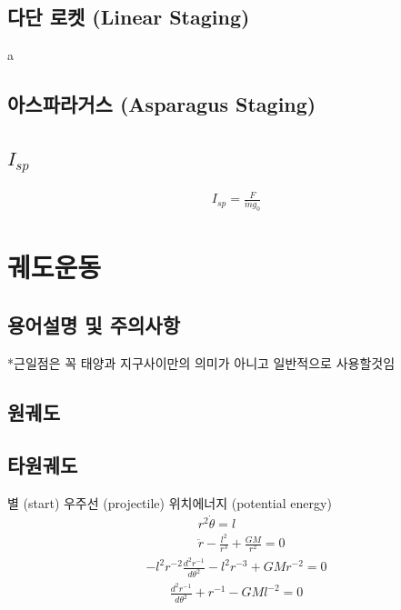 \documentclass[9pt]{amsbook}
\begin{document}
\section{다단 로켓 (Linear Staging)}
a


\section{아스파라거스 (Asparagus Staging)}

\section{$I_{sp}$}
\begin{align}
I_{sp} = \frac{F}{\dot{m}g_0}
\end{align}


\chapter{궤도운동}
\section{용어설명 및 주의사항}
*근일점은 꼭 태양과 지구사이만의 의미가 아니고 일반적으로 사용할것임
\section{원궤도}
\section{타원궤도}
별 (start) 우주선 (projectile) 위치에너지 (potential energy)
\begin{align}
&r^2 \dot{\theta} = l
\\&\ddot{r}-\frac{l^2}{r^3}+\frac{GM}{r^2} = 0
\end{align}
\begin{align}
	-l^2r^{-2}\frac{d^2r^{-1}}{d\theta^2}-l^2r^{-3}+GMr^{-2} = 0
\end{align}
\begin{align}
	\frac{d^2r^{-1}}{d\theta^2}+r^{-1}-GMl^{-2} = 0
\end{align}
\end{document}
